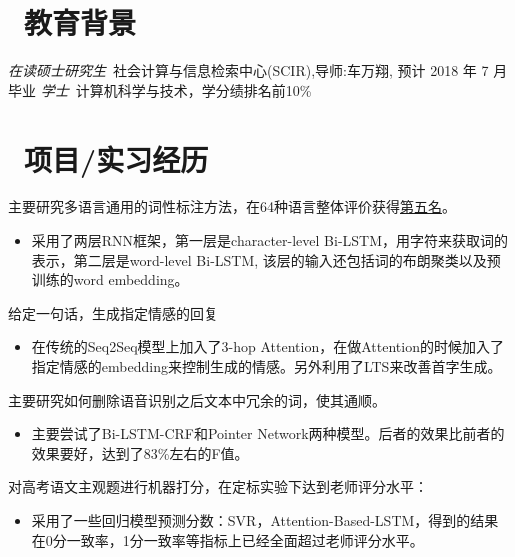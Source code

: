 \documentclass{resume}
\begin{document}


\section{\faGraduationCap\  教育背景}
\textit{在读硕士研究生}\ 社会计算与信息检索中心(SCIR),导师:车万翔, 预计 2018 年 7 月毕业
\textit{学士}\ 计算机科学与技术，学分绩排名前10\%

\section{\faUsers\ 项目/实习经历}


主要研究多语言通用的词性标注方法，在64种语言整体评价获得\href{http://universaldependencies.org/conll17/results-upos.html}{第五名}。
\begin{itemize}
	\item 采用了两层RNN框架，第一层是character-level Bi-LSTM，用字符来获取词的表示，第二层是word-level Bi-LSTM, 该层的输入还包括词的布朗聚类以及预训练的word embedding。
\end{itemize}

给定一句话，生成指定情感的回复
\begin{itemize}
	\item 在传统的Seq2Seq模型上加入了3-hop Attention，在做Attention的时候加入了指定情感的embedding来控制生成的情感。另外利用了LTS来改善首字生成。
\end{itemize}

主要研究如何删除语音识别之后文本中冗余的词，使其通顺。
\begin{itemize}
  \item 主要尝试了Bi-LSTM-CRF和Pointer Network两种模型。后者的效果比前者的效果要好，达到了83\%左右的F值。

\end{itemize}

\begin{onehalfspacing}
对高考语文主观题进行机器打分，在定标实验下达到老师评分水平：
\begin{itemize}
  \item 采用了一些回归模型预测分数：SVR，Attention-Based-LSTM，得到的结果在0分一致率，1分一致率等指标上已经全面超过老师评分水平。
\end{itemize} 
\end{onehalfspacing}
\end{document}
